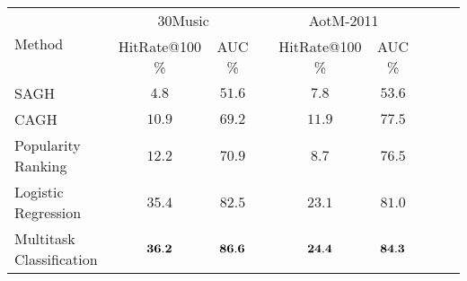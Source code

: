 \begin{tabular}{l*{4}{c}*{4}{c}}
\toprule
\multirow{2}{*}{Method}      & \multicolumn{2}{c}{30Music} && \multicolumn{2}{c}{AotM-2011} \\ \cmidrule{2-3} \cmidrule{5-6}
                             & HitRate@100 \% & AUC \% && HitRate@100 \% & AUC \% \\
\midrule
SAGH &                   \hspace{0.45em}$4.8$ & $51.6$ && \hspace{0.2em} $7.8$ & $53.6$ \\
CAGH &                                 $10.9$ & $69.2$ &&               $11.9$ & $77.5$ \\
Popularity Ranking &                   $12.2$ & $70.9$ && \hspace{0.2em} $8.7$ & $76.5$ \\
Logistic Regression &                  $35.4$ & $82.5$ &&               $23.1$ & $81.0$ \\
Multitask Classification & ${\bf 36.2}$ & ${\bf 86.6}$ &&         ${\bf 24.4}$ & ${\bf 84.3}$ \\
\bottomrule
\end{tabular}
